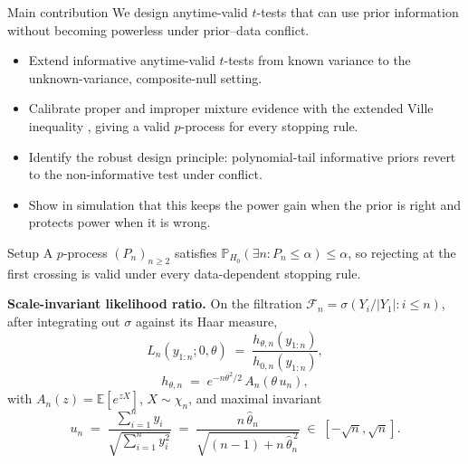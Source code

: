 \documentclass[final]{beamer}
\newcommand{\E}{\mathbb{E}}
\newcommand{\Prob}{\mathbb{P}}
\newcommand{\thetahat}{\widehat{\theta}_n}
\newlength{\colwidth}
\begin{document}
\begin{frame}[t]
\begin{columns}[t]
\begin{column}{\colwidth}
  \begin{alertblock}{Main contribution}
    We design anytime-valid \(t\)-tests that can use prior information \alert{without becoming powerless under prior--data conflict}.

    \begin{itemize}
      \setlength\itemsep{0.20cm}
      \item Extend informative anytime-valid \(t\)-tests from known variance \citep{Cortinovis2025} to the unknown-variance, composite-null setting.
      \item Calibrate proper and improper mixture evidence with the extended Ville inequality \citep{wang2025extended}, giving a valid \(p\)-process for every stopping rule.
      \item Identify the robust design principle: \alert{polynomial-tail informative priors revert to the non-informative test under conflict}.
      \item Show in simulation that this keeps the power gain when the prior is right and protects power when it is wrong.
    \end{itemize}
  \end{alertblock}

  \begin{block}{Setup}
A \alert{$p$-process} $(P_n)_{n\ge 2}$ satisfies $\Prob_{H_0}(\exists n\colon P_n\le\alpha)\le\alpha$, so rejecting at the first crossing is valid under every data-dependent stopping rule.
    
    \textbf{Scale-invariant likelihood ratio.} On the filtration $\mathcal F_n=\sigma(Y_i/|Y_1| : i \le n)$, after integrating out $\sigma$ against its Haar measure,
    \[
      L_n(y_{1:n};0,\theta) \;=\; \frac{h_{\theta,n}(y_{1:n})}{h_{0,n}(y_{1:n})},\]
      \[
      h_{\theta,n}\;=\;e^{-n\theta^{2}/2}\,A_n(\theta\,u_n),
    \]
    with $A_n(z)=\E[e^{zX}]$, $X\sim\chi_n$, and maximal invariant
    \[
      u_n \;=\; \frac{\sum_{i=1}^n y_i}{\sqrt{\sum_{i=1}^n y_i^{2}}}
           \;=\; \frac{n\,\thetahat}{\sqrt{(n-1)+n\,\thetahat^{\,2}}}\;\in\;[-\sqrt n,\sqrt n].
    \]


\end{block}
\end{column}
\end{columns}
\end{frame}
\end{document}
